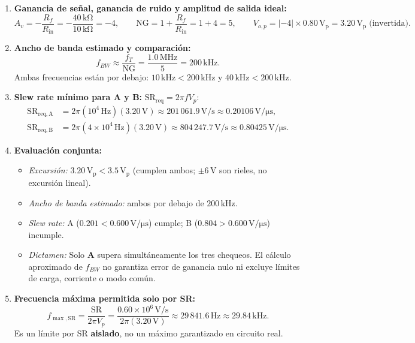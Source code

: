 \documentclass[10pt, a4paper]{article}
\begin{document}
\begin{enumerate}
    \setlength{\itemsep}{2pt}
    \item \textbf{Ganancia de señal, ganancia de ruido y amplitud de salida ideal:}
    \begin{equation}
        A_v = -\frac{R_f}{R_{\mathrm{in}}} = -\frac{40\,\mathrm{k\Omega}}{10\,\mathrm{k\Omega}} = -4, \qquad
        \mathrm{NG} = 1 + \frac{R_f}{R_{\mathrm{in}}} = 1 + 4 = 5, \qquad
        V_{o,p} = |{-4}| \times 0.80\,\mathrm{V_p} = 3.20\,\mathrm{V_p} \;\text{(invertida)}.
    \end{equation}
    \item \textbf{Ancho de banda estimado y comparación:}
    \begin{equation}
        f_{BW} \approx \frac{f_T}{\mathrm{NG}} = \frac{1.0\,\mathrm{MHz}}{5} = 200\,\mathrm{kHz}.
    \end{equation}
    Ambas frecuencias están por debajo: $10\,\mathrm{kHz} < 200\,\mathrm{kHz}$ y $40\,\mathrm{kHz} < 200\,\mathrm{kHz}$.
    \item \textbf{Slew rate mínimo para A y B:} $\mathrm{SR}_{\mathrm{req}} = 2\pi f V_p$:
    \begin{align}
        \mathrm{SR}_{\mathrm{req,A}} &= 2\pi(10^{4}\,\mathrm{Hz})(3.20\,\mathrm{V}) \approx 201\,061.9\,\mathrm{V/s} \approx 0.20106\,\mathrm{V/\mu s}, \\
        \mathrm{SR}_{\mathrm{req,B}} &= 2\pi(4\times 10^{4}\,\mathrm{Hz})(3.20\,\mathrm{V}) \approx 804\,247.7\,\mathrm{V/s} \approx 0.80425\,\mathrm{V/\mu s}.
    \end{align}
    \item \textbf{Evaluación conjunta:}
    \begin{itemize}
        \setlength{\itemsep}{1pt}
        \item \textit{Excursión:} $3.20\,\mathrm{V_p} < 3.5\,\mathrm{V_p}$ (cumplen ambos; $\pm 6\,\mathrm{V}$ son rieles, no excursión lineal).
        \item \textit{Ancho de banda estimado:} ambos por debajo de $200\,\mathrm{kHz}$.
        \item \textit{Slew rate:} A ($0.201 < 0.600\,\mathrm{V/\mu s}$) cumple; B ($0.804 > 0.600\,\mathrm{V/\mu s}$) incumple.
        \item \textit{Dictamen:} Solo \textbf{A} supera simultáneamente los tres chequeos. El cálculo aproximado de $f_{BW}$ no garantiza error de ganancia nulo ni excluye límites de carga, corriente o modo común.
    \end{itemize}
    \item \textbf{Frecuencia máxima permitida solo por SR:}
    \begin{equation}
        f_{\max,\mathrm{SR}} = \frac{\mathrm{SR}}{2\pi V_p} = \frac{0.60\times 10^{6}\,\mathrm{V/s}}{2\pi(3.20\,\mathrm{V})} \approx 29\,841.6\,\mathrm{Hz} \approx 29.84\,\mathrm{kHz}.
    \end{equation}
    Es un límite por SR \textbf{aislado}, no un máximo garantizado en circuito real.
\end{enumerate}
\end{document}
